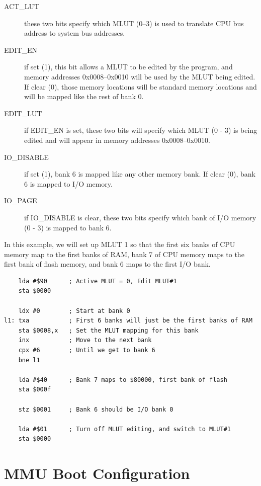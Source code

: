 \begin{description}
	\item[ACT\_LUT] these two bits specify which MLUT (0--3) is used to translate CPU bus address to system bus addresses.

	\item[EDIT\_EN] if set (1), this bit allows a MLUT to be edited by the program, and memory addresses 0x0008--0x0010 will be used by the MLUT being edited. If clear (0), those memory locations will be standard memory locations and will be mapped like the rest of bank 0.

	\item[EDIT\_LUT] if EDIT\_EN is set, these two bits will specify which MLUT (0 - 3) is being edited and will appear in memory addresses 0x0008--0x0010.

	\item[IO\_DISABLE] if set (1), bank 6 is mapped like any other memory bank. If clear (0), bank 6 is mapped to I/O memory.

	\item[IO\_PAGE] if IO\_DISABLE is clear, these two bits specify which bank of I/O memory (0 - 3) is mapped to bank 6.
\end{description}


In this example, we will set up MLUT 1 so that the first six banks of CPU memory map to the first banks of RAM, bank 7 of CPU memory maps to the first bank of flash memory, and bank 6 maps to the first I/O bank.

\begin{verbatim}
    lda #$90      ; Active MLUT = 0, Edit MLUT#1
    sta $0000

    ldx #0        ; Start at bank 0
l1: txa           ; First 6 banks will just be the first banks of RAM
    sta $0008,x   ; Set the MLUT mapping for this bank
    inx           ; Move to the next bank
    cpx #6        ; Until we get to bank 6
    bne l1

    lda #$40      ; Bank 7 maps to $80000, first bank of flash
    sta $000f

    stz $0001     ; Bank 6 should be I/O bank 0

    lda #$01      ; Turn off MLUT editing, and switch to MLUT#1
    sta $0000
\end{verbatim}

\section*{MMU Boot Configuration}
\label{pg:mmu_boot_config}


